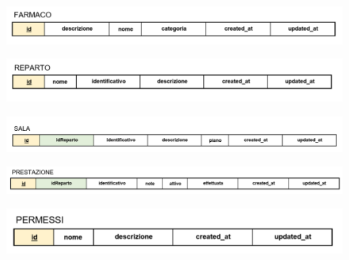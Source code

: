 \documentclass[paper=a4, fontsize=11pt,x11names]{report}
\begin{document}
\begin{figure}[H]
\begin{center}
\includegraphics[scale=0.4]{farmacoSchema}
\end{center}
\end{figure}

\begin{figure}[H]
\begin{center}
\includegraphics[scale=0.4]{repartoSchema}
\end{center}
\end{figure}

\begin{figure}[H]
\begin{center}
\includegraphics[scale=0.4]{salaSchema}
\end{center}
\end{figure}

\begin{figure}[H]
\begin{center}
\includegraphics[scale=0.4]{prestazioneSchema}
\end{center}
\end{figure}

\begin{figure}[H]
\begin{center}
\includegraphics[scale=0.4]{permessiSchema}
\end{center}
\end{figure}
\end{document}
